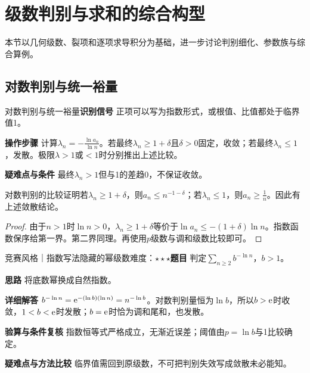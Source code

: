 \section{级数判别与求和的综合构型}\label{ic:delta_series}

\begin{examtip}本节以几何级数、裂项和逐项求导积分为基础，进一步讨论判别细化、参数族与综合算例。\end{examtip}

\subsection{对数判别与统一裕量}\label{ic:delta_series:logtest}\begin{method}{对数判别与统一裕量}\textbf{识别信号} 正项可以写为指数形式，或根值、比值都处于临界值1。\par \textbf{操作步骤} 计算$\lambda_n=-\frac{\ln a_n}{\ln n}$。若最终$\lambda_n\ge1+\delta$且$\delta>0$固定，收敛；若最终$\lambda_n\le1$，发散。极限$\lambda>1$或$<1$时分别推出上述比较。\par \textbf{疑难点与条件} 最终$\lambda_n>1$但与1的差趋0，不保证收敛。\end{method}

\begin{theorem}{对数判别的比较证明}若$\lambda_n\ge1+\delta$，则$a_n\le n^{-1-\delta}$；若$\lambda_n\le1$，则$a_n\ge\frac{1}{n}$。因此有上述敛散结论。\end{theorem}\begin{proof}由于$n>1$时$\ln n>0$，$\lambda_n\ge1+\delta$等价于$\ln a_n\le-(1+\delta)\ln n$。指数函数保序给第一界。第二界同理。再使用$p$级数与调和级数比较即可。\end{proof}

\begin{example}{竞赛风格｜指数写法隐藏的幂级数}{难度：$\star\star\star$}\label{ic:ex:delta_series:logparameter}\textbf{题目} 判定$\sum_{n\ge2}b^{-\ln n}$，$b>1$。\par \textbf{思路} 将底数幂换成自然指数。\par \textbf{详细解答} $b^{-\ln n}=\mathrm{e}^{-(\ln b)(\ln n)}=n^{-\ln b}$。对数判别量恒为$\ln b$，所以$b>\mathrm{e}$时收敛，$1<b<\mathrm{e}$时发散；$b=\mathrm{e}$时恰为调和尾和，也发散。\par \textbf{验算与条件复核} 指数恒等式严格成立，无渐近误差；阈值由$p=\ln b$与1比较确定。\par \textbf{疑难点与方法比较} 临界值需回到原级数，不可把判别失效写成敛散未必能知。\end{example}

